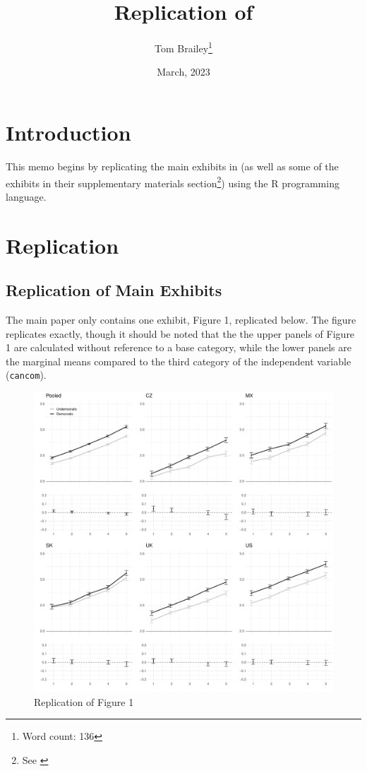 \documentclass[
  12pt,
]{article}
\title{Replication of \textcite{Frederiksen2022a}}
\author{Tom Brailey\footnote{Word count: 136}}
\date{March, 2023}
\begin{document}
\maketitle

{
\hypersetup{linkcolor=}
\setcounter{tocdepth}{2}
\tableofcontents
}
\hypertarget{introduction}{%
\section{Introduction}\label{introduction}}

This memo begins by replicating the main exhibits in \textcite{Frederiksen2022a} (as well as some of the exhibits in their supplementary materials section\footnote{See \autocite{Frederiksen2022b,Frederiksen2022c}}) using the R programming language.

\hypertarget{replication}{%
\section{Replication}\label{replication}}

\hypertarget{replication-of-main-exhibits}{%
\subsection{Replication of Main Exhibits}\label{replication-of-main-exhibits}}

The main paper only contains one exhibit, Figure 1, replicated below. The figure replicates exactly, though it should be noted that the the upper panels of Figure 1 are calculated without reference to a base category, while the lower panels are the marginal means compared to the third category of the independent variable (\texttt{cancom}).

\begin{figure}
\centering
\includegraphics{../exhibits/figures/figure1_replication.pdf}
\caption{\label{fig:unnamed-chunk-2}Replication of Figure 1}
\end{figure}
\end{document}
